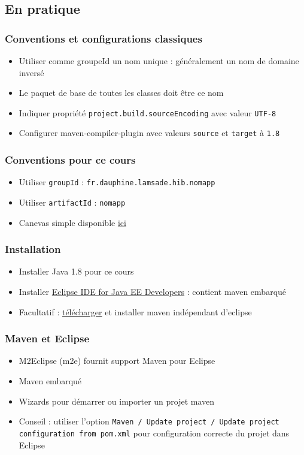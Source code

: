 \documentclass[english, french]{beamer}
\begin{document}
\subsection{En pratique}
\begin{frame}
	\frametitle{Conventions et configurations classiques}
	\begin{itemize}
		\item Utiliser comme groupeId un nom unique : généralement un nom de domaine inversé
		\item Le paquet de base de toutes les classes doit être ce nom
		\item Indiquer propriété \texttt{project.build.sourceEncoding} avec valeur \texttt{UTF-8}
		\item Configurer maven-compiler-plugin avec valeurs \texttt{source} et \texttt{target} à \texttt{1.8}
	\end{itemize}
\end{frame}

\begin{frame}
	\frametitle{Conventions pour ce cours}
	\begin{itemize}
		\item Utiliser \texttt{groupId} : \texttt{fr.dauphine.lamsade.hib.nomapp}
		\item Utiliser \texttt{artifactId} : \texttt{nomapp}
		\item Canevas simple disponible \href{https://github.com/oliviercailloux/jee/tree/master/Sample/pom.xml}{ici}
	\end{itemize}
\end{frame}

\begin{frame}
	\frametitle{Installation}
	\begin{itemize}
		\item Installer Java 1.8 pour ce cours
		\item Installer \href{https://www.eclipse.org/downloads/}{Eclipse IDE for Java EE Developers} : contient maven embarqué
		\item Facultatif : \href{https://maven.apache.org/download.cgi}{télécharger} et installer maven indépendant d’eclipse
	\end{itemize}
\end{frame}

\begin{frame}
	\frametitle{Maven et Eclipse}
	\begin{itemize}
		\item M2Eclipse (m2e) fournit support Maven pour Eclipse
		\item Maven embarqué
		\item Wizards pour démarrer ou importer un projet maven
		\item Conseil : utiliser l’option \texttt{Maven / Update project / Update project configuration from pom.xml} pour configuration correcte du projet dans Eclipse
	\end{itemize}
\end{frame}
\end{document}
